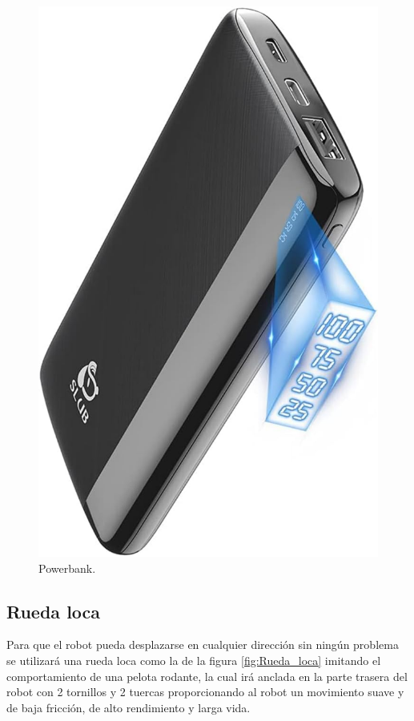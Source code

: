 \begin{figure}[H]
\begin{minipage}{0.48\textwidth}
    \includegraphics[scale=0.13]{figs/powerbank.jpg}
    \caption{Powerbank.} 
    \label{fig:Powerbank}
  \end{minipage}
\end{figure}

\subsection{Rueda loca}
\label{subsec:rueda_loca}

Para que el robot pueda desplazarse en cualquier dirección sin ningún problema se utilizará una rueda loca como la de la figura \ref{fig:Rueda_loca} imitando el comportamiento de una pelota rodante, la cual irá anclada en la parte trasera del robot con 2 tornillos y 2 tuercas proporcionando al robot un movimiento suave y de baja fricción, de alto rendimiento y larga vida.


